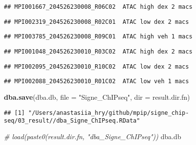 \documentclass[
]{article}
\newenvironment{Shaded}{\begin{snugshade}}{\end{snugshade}}
\newcommand{\CommentTok}[1]{\textcolor[rgb]{0.56,0.35,0.01}{\textit{#1}}}
\newcommand{\DataTypeTok}[1]{\textcolor[rgb]{0.13,0.29,0.53}{#1}}
\newcommand{\KeywordTok}[1]{\textcolor[rgb]{0.13,0.29,0.53}{\textbf{#1}}}
\newcommand{\NormalTok}[1]{#1}
\newcommand{\StringTok}[1]{\textcolor[rgb]{0.31,0.60,0.02}{#1}}
\begin{document}
\begin{verbatim}
## MPI001667_204526230008_R06C02  ATAC high dex 2 macs
\end{verbatim}

\begin{verbatim}
## MPI002319_204526230008_R02C01  ATAC low dex 2 macs
\end{verbatim}

\begin{verbatim}
## MPI003785_204526230008_R09C01  ATAC high veh 1 macs
\end{verbatim}

\begin{verbatim}
## MPI001048_204526230010_R03C02  ATAC high dex 2 macs
\end{verbatim}

\begin{verbatim}
## MPI002095_204526230010_R10C02  ATAC low dex 2 macs
\end{verbatim}

\begin{verbatim}
## MPI002088_204526230010_R01C02  ATAC low veh 1 macs
\end{verbatim}

\begin{Shaded}
\begin{Highlighting}[]
\KeywordTok{dba.save}\NormalTok{(dba.db, }\DataTypeTok{file =} \StringTok{"Signe_ChIPseq"}\NormalTok{, }\DataTypeTok{dir =}\NormalTok{ result.dir.fn)}
\end{Highlighting}
\end{Shaded}

\begin{verbatim}
## [1] "/Users/anastasiia_hry/github/mpip/signe_chip-seq/03_result//dba_Signe_ChIPseq.RData"
\end{verbatim}

\begin{Shaded}
\begin{Highlighting}[]
\CommentTok{# load(paste0(result.dir.fn, "dba_Signe_ChIPseq"))}
\NormalTok{dba.db}
\end{Highlighting}
\end{Shaded}
\end{document}
